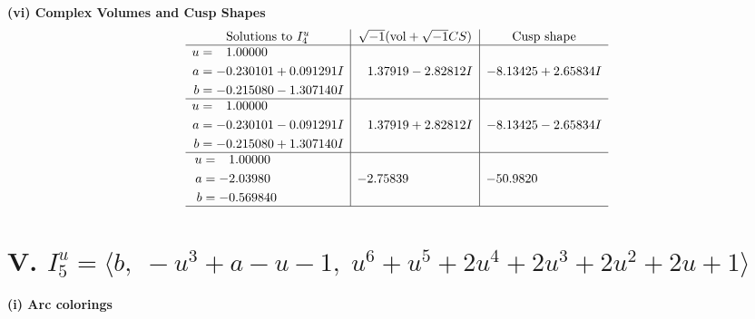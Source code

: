 \documentclass[1p]{elsarticle_modified}
\theoremstyle{definition}
\newcommand{\I}{\sqrt{-1}}
\begin{document}
\newpage\flushleft \textbf{(vi) Complex Volumes and Cusp Shapes}
$$\begin{array}{c|c|c}  
\text{Solutions to }I^u_{4}& \I (\text{vol} + \sqrt{-1}CS) & \text{Cusp shape}\\
 \hline 
\begin{aligned}
u &= \phantom{-}1.00000\phantom{ +0.000000I} \\
a &= -0.230101 + 0.091291 I \\
b &= -0.215080 - 1.307140 I\end{aligned}
 & \phantom{-}1.37919 - 2.82812 I & -8.13425 + 2.65834 I \\ \hline\begin{aligned}
u &= \phantom{-}1.00000\phantom{ +0.000000I} \\
a &= -0.230101 - 0.091291 I \\
b &= -0.215080 + 1.307140 I\end{aligned}
 & \phantom{-}1.37919 + 2.82812 I & -8.13425 - 2.65834 I \\ \hline\begin{aligned}
u &= \phantom{-}1.00000\phantom{ +0.000000I} \\
a &= -2.03980\phantom{ +0.000000I} \\
b &= -0.569840\phantom{ +0.000000I}\end{aligned}
 & -2.75839\phantom{ +0.000000I} & -50.9820\phantom{ +0.000000I}\\
 \hline 
 \end{array}$$\newpage\newpage\renewcommand{\arraystretch}{1}
\centering \section*{V. $I^u_{5}= \langle b,\;- u^3+a- u-1,\;u^6+u^5+2 u^4+2 u^3+2 u^2+2 u+1 \rangle$}
\flushleft \textbf{(i) Arc colorings}\\
\end{document}
